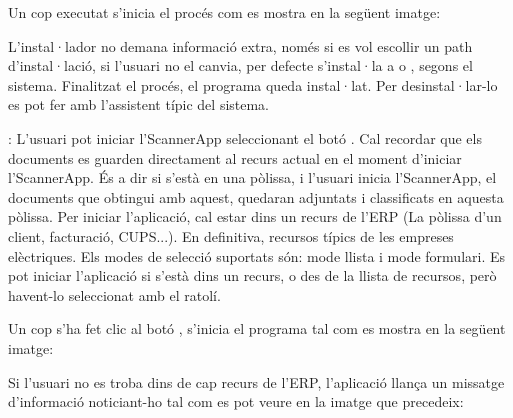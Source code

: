 \documentclass[letterpaper,11pt,catalan]{sphinxmanual}
\begin{document}

Un cop executat s'inicia el procés com es mostra en la següent imatge:


L'instal·lador no demana informació extra, només si es vol escollir un path d'instal·lació, si
l'usuari no el canvia, per defecte s'instal·la a  o ,
segons el sistema. Finalitzat el procés, el programa queda instal·lat.
Per desinstal·lar-lo es pot fer amb l'assistent típic del sistema.


\begin{DUlineblock}{0em}
\item[] 
\end{DUlineblock}

:
L'usuari pot iniciar l'ScannerApp seleccionant el botó .
Cal recordar que els documents es guarden directament al recurs actual en el moment
d'iniciar l'ScannerApp. És a dir si s'està en una pòlissa, i l'usuari inicia l'ScannerApp,
el documents que obtingui amb aquest, quedaran adjuntats i classificats en aquesta pòlissa.
Per iniciar l'aplicació, cal estar dins un recurs de l'ERP (La pòlissa d'un client, facturació, CUPS...). En
definitiva, recursos típics de les empreses elèctriques.
Els modes de selecció suportats són: mode llista i mode formulari. Es pot iniciar l'aplicació si s'està
dins un recurs, o des de la llista de recursos, però havent-lo seleccionat amb el ratolí.

Un cop s'ha fet clic al botó , s'inicia el programa tal com es mostra en la següent imatge:


Si l'usuari no es troba dins de cap recurs de l'ERP, l'aplicació llança un missatge d'informació noticiant-ho tal com
es pot veure en la imatge que precedeix:
\end{document}
